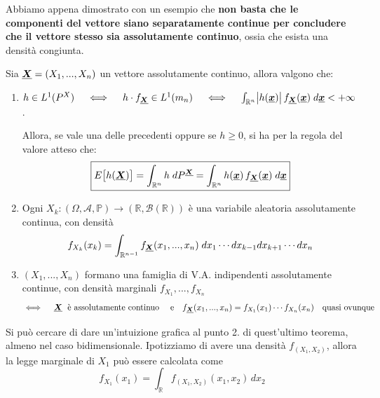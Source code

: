 Abbiamo appena dimostrato con un esempio che \textbf{non basta che le componenti del vettore siano separatamente continue per concludere che il vettore stesso sia assolutamente continuo}, ossia che esista una densità congiunta.

\begin{teorema}
    Sia $\underline{{\boldsymbol{X}}} = (X_1, ..., X_n)$ un vettore assolutamente continuo, allora valgono che:
    \begin{enumerate}
        \item $h\in L^1(P^X)\quad \iff \quad h\cdot f_{\underline{{\boldsymbol{X}}}}\in L^1(m_n) \quad \iff \quad \int_{\mathbb{R}^n}\bigl|h(\underline{{\boldsymbol{x}}})\bigr|\,f_{\underline{{\boldsymbol{X}}}}(\underline{{\boldsymbol{x}}})\;d\underline{{\boldsymbol{x}}}<+\infty$. 

        \medskip
        \noindent Allora, se vale una delle precedenti oppure se $h\geq0$, si ha per la regola del valore atteso che:
        \[\boxed{E\bigl[h(\underline{{\boldsymbol{X}}})\bigr] = \int_{\mathbb{R}^n} h\;dP^{\underline{{\boldsymbol{X}}}} = \int_{\mathbb{R}^n}h(\underline{{\boldsymbol{x}}})\,f_{\underline{{\boldsymbol{X}}}}(\underline{{\boldsymbol{x}}})\;d\underline{{\boldsymbol{x}}}}\]
        \item Ogni $X_k:(\Omega, \mathcal{A}, \mathbb{P})\to (\mathbb{R}, \mathcal{B}(\mathbb{R}))$ è una variabile aleatoria assolutamente continua, con densità
        \[f_{X_k}(x_k) = \int_{\mathbb{R}^{n-1}}f_{\underline{{\boldsymbol{X}}}}(x_1, ..., x_n)\;dx_1\cdots dx_{k-1}dx_{k+1}\cdots dx_n\]
        \item $(X_1, ..., X_n)$ formano una famiglia di V.A. indipendenti assolutamente continue, con densità marginali $f_{X_1}, ..., f_{X_n}$
        \[\iff \quad \underline{{\boldsymbol{X}}}\;\text{ è assolutamente continuo }\quad \text{e}\quad f_{\underline{{\boldsymbol{X}}}}(x_1, ..., x_n) = f_{X_1}(x_1)\cdots f_{X_n}(x_n)\quad \text{quasi ovunque}\]
    \end{enumerate}
\end{teorema}

Si può cercare di dare un'intuizione grafica al punto 2. di quest'ultimo teorema, almeno nel caso bidimensionale. Ipotizziamo di avere una densità $f_{(X_1, X_2)}$, allora la legge marginale di $X_1$ può essere calcolata come
\[f_{X_1}(x_1)=\int_{\mathbb{R}} f_{(X_1,X_2)}(x_1,x_2)\,dx_2\]

